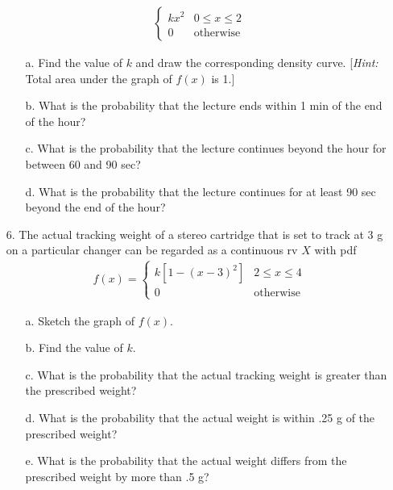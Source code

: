 \documentclass[letterpaper,12pt]{article}
\begin{document}
\begin{enumerate}
\begin{align*}
\begin{cases}
        kx^2 & 0 \le x \le 2 \\
        0    & \text{otherwise}
      \end{cases}
    \end{align*}
    \begin{enumerate}
      \item[a.]
        Find the value of $k$ and draw the corresponding density curve. [\textit{Hint:} Total area under the graph of $f(x)$ is 1.]
      \item[b.]
        What is the probability that the lecture ends within 1 min of the end of the hour?
      \item[c.]
        What is the probability that the lecture continues beyond the hour for between 60 and 90 sec?
      \item[d.]
        What is the probability that the lecture continues for at least 90 sec beyond the end of the hour?
    \end{enumerate}
  \item[6.]
    The actual tracking weight of a stereo cartridge that is set to track at 3 g on a particular changer can be regarded as a continuous rv $X$ with pdf
    \begin{align*}
      f(x) = \begin{cases}
        k[1 - (x - 3)^2] & 2 \le x \le 4 \\
        0                & \text{otherwise}
      \end{cases}
    \end{align*}
    \begin{enumerate}
      \item[a.]
        Sketch the graph of $f(x)$.
      \item[b.]
        Find the value of $k$.
      \item[c.]
        What is the probability that the actual tracking weight is greater than the prescribed weight?
      \item[d.]
        What is the probability that the actual weight is within .25 g of the prescribed weight?
      \item[e.]
        What is the probability that the actual weight differs from the prescribed weight by more than .5 g?
    \end{enumerate}
  \end{enumerate}
\end{document}
